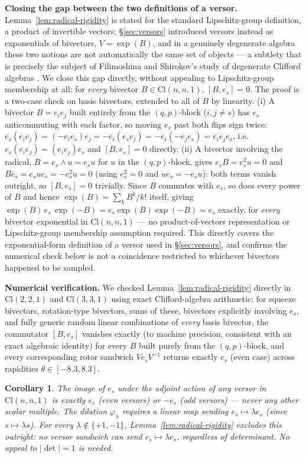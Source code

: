 \documentclass[11pt]{article}
\newtheorem{corollary}{Corollary}
\newcommand{\Cl}{\mathrm{Cl}}
\begin{document}
\textbf{Closing the gap between the two definitions of a versor.} Lemma~\ref{lem:radical-rigidity} is stated for the standard Lipschitz-group definition, a product of invertible vectors; \S\ref{sec:versors} introduced versors instead as exponentials of bivectors, $V=\exp(B)$, and in a genuinely degenerate algebra these two notions are not automatically the same set of objects — a subtlety that is precisely the subject of Filimoshina and Shirokov's study of degenerate Clifford algebras \cite{filimoshina2023degenerate}. We close this gap directly, without appealing to Lipschitz-group membership at all: for \emph{every} bivector $B\in\Cl(n,n,1)$, $[B,e_s]=0$. The proof is a two-case check on basis bivectors, extended to all of $B$ by linearity. (i) A bivector $B=e_ie_j$ built entirely from the $(q,p)$-block ($i,j\ne s$) has $e_s$ anticommuting with each factor, so moving $e_s$ past both flips sign twice: $e_s(e_ie_j)=(-e_ie_s)e_j=-e_i(e_se_j)=-e_i(-e_je_s)=e_ie_je_s$, i.e.\ $e_s(e_ie_j)=(e_ie_j)e_s$ and $[B,e_s]=0$ directly. (ii) A bivector involving the radical, $B=e_s\wedge u=e_su$ for $u$ in the $(q,p)$-block, gives $e_sB=e_s^2u=0$ and $Be_s=e_sue_s=-e_s^2u=0$ (using $e_s^2=0$ and $ue_s=-e_su$): both terms vanish outright, so $[B,e_s]=0$ trivially. Since $B$ commutes with $e_s$, so does every power of $B$ and hence $\exp(B)=\sum_k B^k/k!$ itself, giving $\exp(B)\,e_s\,\exp(-B)=e_s\exp(B)\exp(-B)=e_s$ exactly, for \emph{every} bivector exponential in $\Cl(n,n,1)$ — no product-of-vectors representation or Lipschitz-group membership assumption required. This directly covers the exponential-form definition of a versor used in \S\ref{sec:versors}, and confirms the numerical check below is not a coincidence restricted to whichever bivectors happened to be sampled.

\textbf{Numerical verification.} We checked Lemma~\ref{lem:radical-rigidity} directly in $\Cl(2,2,1)$ and $\Cl(3,3,1)$ using exact Clifford-algebra arithmetic: for squeeze bivectors, rotation-type bivectors, sums of these, bivectors explicitly involving $e_s$, and fully generic random linear combinations of \emph{every} basis bivector, the commutator $[B,e_s]$ vanishes exactly (to machine precision, consistent with an exact algebraic identity) for every $B$ built purely from the $(q,p)$-block, and every corresponding rotor sandwich $V e_s V^{-1}$ returns exactly $e_s$ (even case) across rapidities $\theta\in[-8.3,8.3]$.

\begin{corollary}
\label{cor:dilation-excluded}
The image of $e_s$ under the adjoint action of any versor in $\Cl(n,n,1)$ is exactly $e_s$ (even versors) or $-e_s$ (odd versors) — never any other scalar multiple. The dilation $\varphi_\lambda$ requires a linear map sending $e_s\mapsto\lambda e_s$ (since $s\mapsto\lambda s$). For every $\lambda\notin\{+1,-1\}$, Lemma~\ref{lem:radical-rigidity} excludes this outright: no versor sandwich can send $e_s\mapsto\lambda e_s$, regardless of determinant. No appeal to $|\det|=1$ is needed.
\end{corollary}
\end{document}
